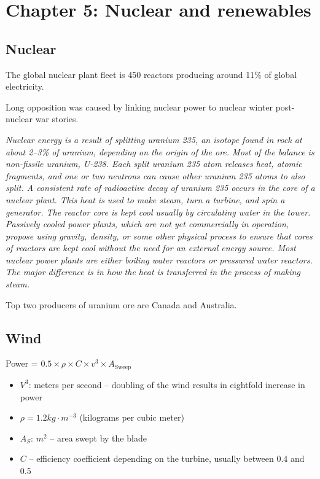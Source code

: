 \section{Chapter 5: Nuclear and renewables}

\subsection{Nuclear}

The global nuclear plant fleet is 450 reactors producing around 11\% of global
electricity.

Long opposition was caused by linking nuclear power to nuclear winter
post-nuclear war stories.

\textit{
Nuclear energy is a result of splitting uranium 235, an isotope found in rock
at about 2–3\% of uranium, depending on the origin of the ore. Most of the
balance is non-fissile uranium, U-238. Each split uranium 235 atom releases
heat, atomic fragments, and one or two neutrons can cause other uranium 235
atoms to also split. A consistent rate of radioactive decay of uranium 235
occurs in the core of a nuclear plant. This heat is used to make steam, turn a
turbine, and spin a generator. The reactor core is kept cool usually by
circulating water in the tower. Passively cooled power plants, which are not
yet commercially in operation, propose using gravity, density, or some other
physical process to ensure that cores of reactors are kept cool without the
need for an external energy source. Most nuclear power plants are either
boiling water reactors or pressured water reactors. The major difference is in
how the heat is transferred in the process of making steam.
}

Top two producers of uranium ore are Canada and Australia.

\subsection{Wind}

Power = $0.5 \times \rho \times C \times v^3 \times A_{\text{Sweep}}$

\begin{itemize}
	\item $V^3$: meters per second -- doubling of the wind results in
	eightfold increase in power
	\item $\rho = 1.2kg \cdot m^{-3}$ (kilograms per cubic meter)
	\item $A_S$: $m^2$ -- area swept by the blade
	\item $C$ -- efficiency coefficient depending on the turbine, usually
	between 0.4 and 0.5
\end{itemize}

